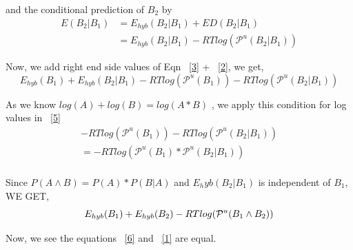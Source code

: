 \documentclass[twoside,a4paper]{report}
\begin{document}
	and the conditional prediction of $B_2$ by\\
	
	\begin{align}
	E(B_2 | B_1) &= E_{hyb}( B_2 | B_1 )+ ED(B_2 | B_1)\nonumber \\
	& = E_{hyb}(B_2 | B_1) - RTlog(\mathcal{P}^u(B_2 | B_1)) \label{3}
	\end{align}

Now, we add right end side values of Eqn ~\ref{3} + ~\ref{2}, we get,\\
	\begin{equation}
	\label{5}
	 E_{hyb}(B_1) + E_{hyb}(B_2 | B_1) - RTlog(\mathcal{P}^u(B_1)) - RTlog(\mathcal{P}^u(B_2 | B_1))
	\end{equation}
	 
	As we know $log (A) + log (B) = log( A * B)$ , we apply this condition for log values in ~\ref{5}\\
	
	\begin{align*}
		-RTlog(\mathcal{P}^u(B_1)) - RTlog(\mathcal{P}^u(B_2 | B_1))\\
	=	-RTlog(\mathcal{P}^u(B_1) * \mathcal{P}^u(B_2 | B_1))\\
	\end{align*}
	
	Since $P(A \land B) = P(A) * P(B |A)$ and $E_hyb(B_2 | B_1)$ is independent of $B_1$, WE GET,\\
	
%
% 	
 	\begin{equation}
 	\label{6}
 	E_{hyb}(B_1) + E_{hyb}(B_2) - RTlog(\mathcal{P}^u(B_1 \land B_2))\\
 	\end{equation}
	
	Now,  we see the equations ~\ref{6} and ~\ref{1} are equal. \\
	
	
%	
%	
\end{document}
